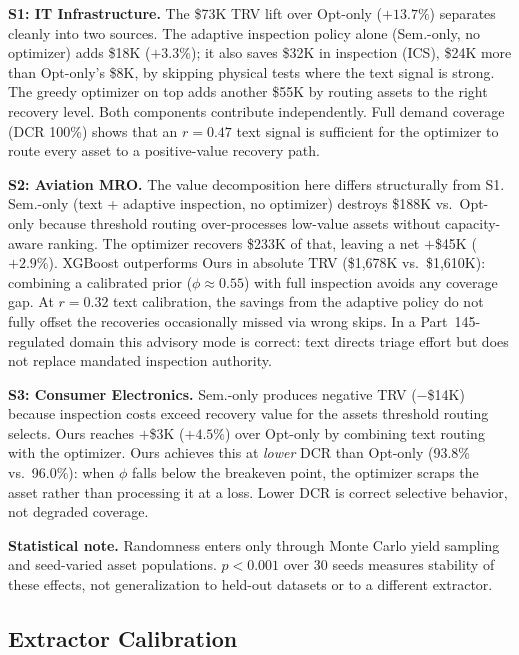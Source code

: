 \documentclass[conference]{IEEEtran}
\begin{document}
\smallskip\noindent\textbf{S1: IT Infrastructure.}
The \$73K TRV lift over Opt-only ($+13.7\%$) separates cleanly into two sources.
The adaptive inspection policy alone (Sem.-only, no optimizer) adds \$18K
($+3.3\%$); it also saves \$32K in inspection (ICS), \$24K more than Opt-only's
\$8K, by skipping physical tests where the text signal is strong. The greedy
optimizer on top adds another \$55K by routing assets to the right recovery level.
Both components contribute independently. Full demand coverage (DCR 100\%) shows
that an $r{=}0.47$ text signal is sufficient for the optimizer to route every
asset to a positive-value recovery path.

\smallskip\noindent\textbf{S2: Aviation MRO.}
The value decomposition here differs structurally from S1. Sem.-only (text +
adaptive inspection, no optimizer) destroys \$188K vs.\ Opt-only because
threshold routing over-processes low-value assets without capacity-aware ranking.
The optimizer recovers \$233K of that, leaving a net $+$\$45K ($+2.9\%$). XGBoost
outperforms Ours in absolute TRV (\$1,678K vs.\ \$1,610K): combining a
calibrated prior ($\phi{\approx}0.55$) with full inspection avoids any coverage
gap. At $r{=}0.32$ text calibration, the savings from the adaptive policy do not
fully offset the recoveries occasionally missed via wrong skips. In a
Part~145-regulated domain this advisory mode is correct: text directs triage
effort but does not replace mandated inspection authority.

\smallskip\noindent\textbf{S3: Consumer Electronics.}
Sem.-only produces negative TRV ($-$\$14K) because inspection costs exceed
recovery value for the assets threshold routing selects. Ours reaches
$+$\$3K ($+4.5\%$) over Opt-only by combining text routing with the optimizer.
Ours achieves this at \emph{lower} DCR than Opt-only (93.8\% vs.\ 96.0\%):
when $\phi$ falls below the breakeven point, the optimizer scraps the asset
rather than processing it at a loss. Lower DCR is correct selective behavior,
not degraded coverage.

\smallskip\noindent\textbf{Statistical note.}
Randomness enters only through Monte Carlo yield sampling and seed-varied asset
populations. $p{<}0.001$ over 30 seeds measures stability of these effects,
not generalization to held-out datasets or to a different extractor.

\subsection{Extractor Calibration}\label{sec:calibration}
\end{document}
